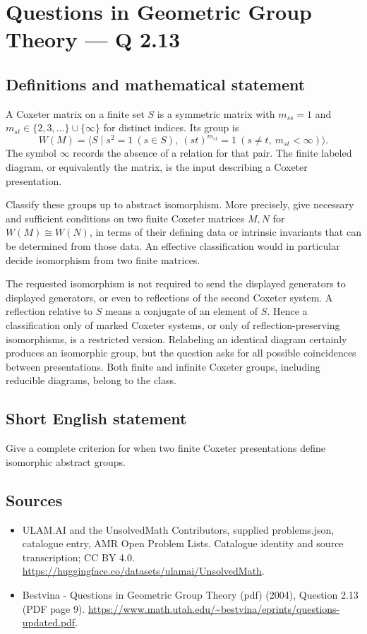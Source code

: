 \documentclass[11pt,a4paper]{article}
\begin{document}
\section*{Questions in Geometric Group Theory — Q 2.13}\label{statement}

\subsection{Definitions and mathematical statement}
A Coxeter matrix on a finite set $S$ is a symmetric matrix with $m_{ss}=1$ and $m_{st}\in\{2,3,\ldots\}\cup\{\infty\}$ for distinct indices. Its group is
\[
 W(M)=\langle S\mid s^2=1\ (s\in S),\ (st)^{m_{st}}=1
                  \ (s\ne t,\ m_{st}<\infty)\rangle.
\]
The symbol $\infty$ records the absence of a relation for that pair. The finite labeled diagram, or equivalently the matrix, is the input describing a Coxeter presentation.

Classify these groups up to abstract isomorphism. More precisely, give necessary and sufficient conditions on two finite Coxeter matrices $M,N$ for $W(M)\cong W(N)$, in terms of their defining data or intrinsic invariants that can be determined from those data. An effective classification would in particular decide isomorphism from two finite matrices.

The requested isomorphism is not required to send the displayed generators to displayed generators, or even to reflections of the second Coxeter system. A reflection relative to $S$ means a conjugate of an element of $S$. Hence a classification only of marked Coxeter systems, or only of reflection-preserving isomorphisms, is a restricted version. Relabeling an identical diagram certainly produces an isomorphic group, but the question asks for all possible coincidences between presentations. Both finite and infinite Coxeter groups, including reducible diagrams, belong to the class.
\subsection{Short English statement}
Give a complete criterion for when two finite Coxeter presentations define isomorphic abstract groups.
\subsection{Sources}
\begin{itemize}
\item[S1] ULAM.AI and the UnsolvedMath Contributors, supplied problems.json, catalogue entry, AMR Open Problem Lists. Catalogue identity and source transcription; CC BY 4.0.
\url{https://huggingface.co/datasets/ulamai/UnsolvedMath}.
\item[S2] Bestvina - Questions in Geometric Group Theory (pdf) (2004), Question 2.13 (PDF page 9). 
\url{https://www.math.utah.edu/~bestvina/eprints/questions-updated.pdf}.
\end{itemize}
\end{document}

